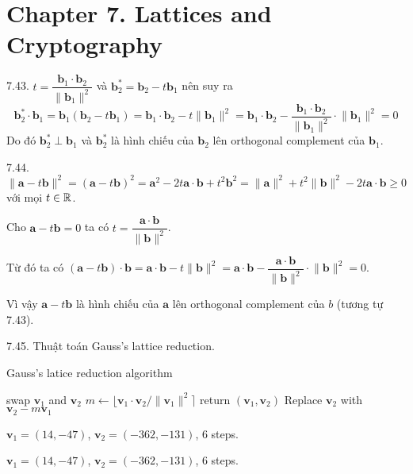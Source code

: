 \section*{Chapter 7. Lattices and Cryptography}

7.43. $t = \dfrac{\bm{b}_1 \cdot \bm{b}_2}{\lVert \bm{b}_1 \rVert^2}$ và $\bm{b}_2^* = \bm{b}_2 - t \bm{b}_1$ nên suy ra
\begin{equation*}
	\bm{b}_2^* \cdot \bm{b}_1 = \bm{b}_1 (\bm{b}_2 - t \bm{b}_1) = \bm{b}_1 \cdot \bm{b}_2 - t \lVert \bm{b}_1 \rVert^2 = \bm{b}_1 \cdot \bm{b}_2 - \dfrac{\bm{b}_1 \cdot \bm{b}_2}{\lVert \bm{b}_1 \rVert^2} \cdot \lVert \bm{b}_1 \rVert^2 = 0
\end{equation*}
Do đó $\bm{b}_2^* \perp \bm{b}_1$ và $\bm{b}_2^*$ là hình chiếu của $\bm{b}_2$ lên orthogonal complement của $\bm{b}_1$.

7.44. $\lVert \bm{a} - t \bm{b} \rVert^2 = (\bm{a} - t \bm{b})^2 = \bm{a}^2 - 2t \bm{a} \cdot \bm{b} + t^2 \bm{b}^2 = \lVert \bm{a} \rVert^2 + t^2 \lVert \bm{b} \rVert^2 - 2t \bm{a} \cdot \bm{b} \geqslant 0$ với mọi $t \in \mathbb{R}$.

Cho $\bm{a} - t \bm{b} = 0$ ta có $t = \dfrac{\bm{a} \cdot \bm{b}}{\lVert \bm{b} \rVert^2}$.

Từ đó ta có $(\bm{a} - t \bm{b}) \cdot \bm{b} = \bm{a} \cdot \bm{b} - t \lVert \bm{b} \rVert^2 = \bm{a} \cdot \bm{b} - \dfrac{\bm{a} \cdot \bm{b}}{\lVert \bm{b} \rVert^2} \cdot \lVert \bm{b} \rVert^2 = 0$.

Vì vậy $\bm{a} - t \bm{b}$ là hình chiếu của $\bm{a}$ lên orthogonal complement của $b$ (tương tự 7.43).
	
7.45. Thuật toán Gauss's lattice reduction.

\begin{algorithm}[ht]
	\caption{Gauss's latice reduction algorithm}
	\begin{algorithmic}
				\State swap $\bm{v}_1$ and $\bm{v}_2$	
				\State $m \gets \lfloor \bm{v}_1 \cdot \bm{v}_2 / \lVert \bm{v}_1 \rVert^2 \rceil$
			\EndIf
				\State return $(\bm{v}_1, \bm{v}_2)$
			\EndIf
			\State Replace $\bm{v}_2$ with $\bm{v}_2 - m\bm{v}_1$
		\EndWhile
	\end{algorithmic}
\end{algorithm}
	
$\bm{v}_1 = (14, -47)$, $\bm{v}_2 = (-362, -131)$, 6 steps.

$\bm{v}_1 = (14, -47)$, $\bm{v}_2 = (-362, -131)$, 6 steps.

